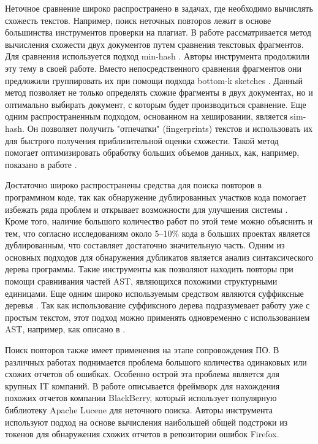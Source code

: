 \documentclass[14pt]{matmex-diploma-custom}
\begin{document}
Неточное сравнение широко распространено в задачах, где необходимо вычислять схожесть текстов. Например, поиск неточных повторов лежит в основе большинства инструментов проверки на плагиат. В работе \cite{bib:tool:Allign} рассматривается метод вычисления схожести двух документов путем сравнения текстовых фрагментов. Для сравнения используется подход min-hash \cite{bib:art:MinHash}. Авторы инструмента \cite{bib:tool:TxtAling} продолжили эту тему в своей работе. Вместо непосредственного сравнения фрагментов они предложили группировать их при помощи подхода bottom-k sketches \cite{bib:art:Bottom-sketch}. Данный метод позволяет не только определять схожие фрагменты в двух документах, но и оптимально выбирать документ, с которым будет производиться сравнение. Еще одним распространенным подходом, основанном на хешировании, является sim-hash\cite{bib:art:SimHash}. Он позволяет получить "отпечатки" (fingerprints) текстов и использовать их для быстрого получения приблизительной оценки схожести. Такой метод помогает оптимизировать обработку больших объемов данных, как, например, показано в работе \cite{bib:tool:SpamDetect}.

Достаточно широко распространены средства для поиска повторов в программном коде, так как обнаружение дублированных участков кода помогает избежать ряда проблем и открывает возможности для улучшения системы \cite{bib:art:SoftwareClonesSurvey, bib:art:SoftwareClonesReview}. Кроме того, наличие большого количество работ по этой теме можно объяснить и тем, что согласно исследованиям \cite{bib:art:LagueCloneStudy, bib:art:BakerCloneStudy} около 5--10\% кода в больших проектах является дублированным, что составляет достаточно значительную часть. Одним из основных подходов для обнаружения дубликатов является анализ синтаксического дерева программы. Такие инструменты как \cite{bib:tool:ASTRefactor, bib:tool:ASTSearch} позволяют находить повторы при помощи сравнивания частей AST, являющихся похожими структурными единицами. Еще одним широко используемым средством являются суффиксные деревья \cite{bib:art:SuffixTree}. Так как использование суффиксного дерева подразумевает работу уже с простым текстом, этот подход можно применять одновременно с использованием AST, например, как описано в \cite{bib:tool:ASTSuffix}.

Поиск повторов также имеет применения на этапе сопровождения ПО. В различных работах поднимается проблема большого количества одинаковых или схожих отчетов об ошибках. Особенно острой эта проблема является для крупных IT компаний. В работе \cite{bib:tool:DefectDetection} описывается фреймворк для нахождения похожих отчетов компании BlackBerry, который использует популярную библиотеку Apache Lucene \cite{bib:tool:Lucene} для неточного поиска. Авторы инструмента \cite{bib:tool:DuplicateBugs} используют подход на основе вычисления наибольшей общей подстроки из токенов \cite{bib:art:LCS} для обнаружения схожих отчетов в репозитории ошибок Firefox.
\end{document}
